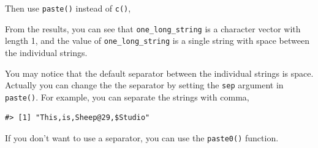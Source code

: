 \documentclass[
]{book}
\newenvironment{Shaded}{\begin{snugshade}}{\end{snugshade}}
\newcommand{\AttributeTok}[1]{\textcolor[rgb]{0.77,0.63,0.00}{#1}}
\newcommand{\CommentTok}[1]{\textcolor[rgb]{0.56,0.35,0.01}{\textit{#1}}}
\newcommand{\FunctionTok}[1]{\textcolor[rgb]{0.00,0.00,0.00}{#1}}
\newcommand{\NormalTok}[1]{#1}
\newcommand{\OtherTok}[1]{\textcolor[rgb]{0.56,0.35,0.01}{#1}}
\newcommand{\StringTok}[1]{\textcolor[rgb]{0.31,0.60,0.02}{#1}}
\begin{document}
\begin{Shaded}
\end{Shaded}

Then use \texttt{paste()} instead of \texttt{c()},

\begin{Shaded}
\end{Shaded}

From the results, you can see that \texttt{one\_long\_string} is a character vector with length 1, and the value of \texttt{one\_long\_string} is a single string with space between the individual strings.

You may notice that the default separator between the individual strings is space.
Actually you can change the the separator by setting the \texttt{sep} argument in \texttt{paste()}. For example, you can separate the strings with comma,

\begin{Shaded}
\end{Shaded}

\begin{verbatim}
#> [1] "This,is,Sheep@29,$Studio"
\end{verbatim}

If you don't want to use a separator, you can use the \texttt{paste0()} function.
\end{document}
